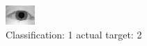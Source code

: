 \begin{figure}[h!]
\begin{center}
\includegraphics[width=0.60\columnwidth]{figures/ID986_class_1_target_2.png}
\end{center}
\caption{ Classification: 1 actual target: 2}
\label{fig:ID986_class_1_target_2}
\end{figure}
